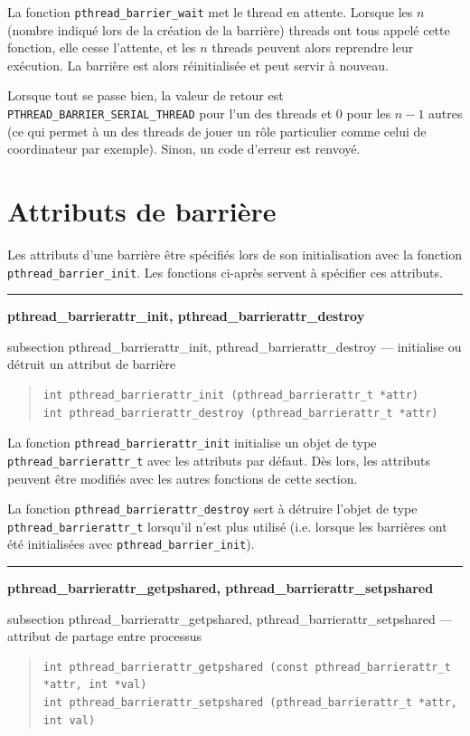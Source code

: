 \documentclass [twoside] {report}
\newcommand {\primitive} [1]
    {
	\phantomsection
	{\large \textbf {#1}}
	\addcontentsline {toc} {subsection} {#1}
    }
\newcommand {\separation}
    {
	\vspace {5mm}
	\nopagebreak
	\hrule
    }
\begin{document}
La fonction \verb|pthread_barrier_wait| met le thread en attente. Lorsque
les $n$ (nombre indiqué lors de la création de la barrière) threads
ont tous appelé cette fonction, elle cesse l'attente, et les $n$
threads peuvent alors reprendre leur exécution. La barrière est alors
réinitialisée et peut servir à nouveau.

Lorsque tout se passe bien, la valeur de retour est
\verb|PTHREAD_BARRIER_SERIAL_THREAD| pour l'un des threads et 0 pour
les $n-1$ autres (ce qui permet à un des threads de jouer un rôle
particulier comme celui de coordinateur par exemple). Sinon, un code
d'erreur est renvoyé.


\section {Attributs de barrière}

Les attributs d'une barrière être spécifiés lors de son initialisation
avec la fonction \verb|pthread_barrier_init|. Les fonctions ci-après
servent à spécifier ces attributs.

\separation
\primitive {pthread\_barrierattr\_init, pthread\_barrierattr\_destroy} ---
initialise ou détruit un attribut de barrière

\begin {quote}
\begin {verbatim}
int pthread_barrierattr_init (pthread_barrierattr_t *attr)
int pthread_barrierattr_destroy (pthread_barrierattr_t *attr)
\end{verbatim}
\end {quote}

La fonction \verb|pthread_barrierattr_init| initialise un objet de type
\verb|pthread_barrierattr_t| avec les attributs par défaut. Dès lors,
les attributs peuvent être modifiés avec les autres fonctions de
cette section.

La fonction \verb|pthread_barrierattr_destroy| sert à détruire
l'objet de type \verb|pthread_barrierattr_t| lorsqu'il n'est plus
utilisé (i.e.  lorsque les barrières ont été initialisées avec
\verb|pthread_barrier_init|).


\separation
\primitive {pthread\_barrierattr\_getpshared, pthread\_barrierattr\_setpshared} --- attribut de partage entre processus

\begin {quote}
\begin {verbatim}
int pthread_barrierattr_getpshared (const pthread_barrierattr_t *attr, int *val)
int pthread_barrierattr_setpshared (pthread_barrierattr_t *attr, int val)
\end{verbatim}
\end {quote}
\end{document}
